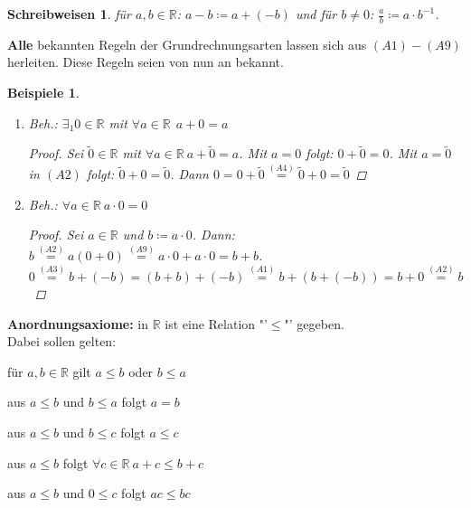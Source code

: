\documentclass[titlepage,ngerman,a4paper,headsepline]{scrartcl}
\newcommand{\R}{\mathbb{R}}
\theoremstyle{named}
\theoremstyle{dotless}
\newtheorem*{beispiele}{Beispiele}
\newtheorem*{schreibweisen}{Schreibweisen}
\begin{document}
\begin{schreibweisen}
	für $a, b \in \R$: $a - b \coloneqq a + (-b)$ und für $b \neq 0$: $ \frac{a}{b} \coloneqq a \cdot b^{-1}$.
\end{schreibweisen}


\textbf{Alle} bekannten Regeln der Grundrechnungsarten lassen sich aus \hyperref[k.axiom]{$(A1) - (A9)$} herleiten. Diese Regeln seien von nun an bekannt.


\begin{beispiele} ~\
	\begin{enumerate}
		\item Beh.: $\exists_{1} 0 \in  \R$ mit $\forall a \in \R \: \ a + 0 = a$
		  \begin{proof}
			Sei $\tilde{0} \in \R$ mit $\forall a \in \R \: a + \tilde{0} = a$. Mit $a = 0$ folgt: $0 + \tilde{0} = 0$. Mit $a = \tilde{0}$ in \hyperref[k.axiom-a2]{$(A2)$} folgt: $\tilde{0} + 0 = \tilde{0}$. Dann $0 = 0 + \tilde{0} \overset{\hyperref[k.axiom-a4]{(A4)}}{=} \tilde{0} + 0 = \tilde{0}$
		  \end{proof}
		 \item Beh.: $\forall a \in \R \: a \cdot 0 = 0$
		   \begin{proof}
		     Sei $a \in \R$ und $b \coloneqq a \cdot 0$. Dann: $b \overset{\hyperref[k.axiom-a2]{(A2)}}{=} a (0 + 0) \overset{\hyperref[k.axiom-a9]{(A9)}}{=} a \cdot 0 + a \cdot 0 = b + b$. \\
		     $0 \overset{\hyperref[k.axiom-a2]{(A3)}}{=} b + (-b) = (b + b) + (-b) \overset{\hyperref[k.axiom-a1]{(A1)}}{=} b + (b + (-b)) = b + 0 \overset{\hyperref[k.axiom-a2]{(A2)}}{=} b$
		   \end{proof}
	\end{enumerate}
\end{beispiele}

\textbf{Anordnungsaxiome:} in $\R$ ist eine Relation "'$\leq$"' gegeben. \\
Dabei sollen gelten:
\begin{description} \addtolength{\itemindent}{0.4cm}
	\item[$(A10)$] für $a, b \in \R$ gilt $a \leq b$ oder $b \leq a$ \label{a.axiom-a10}
	\item[$(A11)$] aus $a \leq b$ und $b \leq a$ folgt $a = b$ \label{a.axiom-a11}
	\item[$(A12)$] aus $a \leq b$ und $b \leq c$ folgt $a \leq c$ \label{a.axiom-a12}
	\item[$(A13)$] aus $a \leq b$ folgt $\forall c \in \R \: a + c \leq b + c$ \label{a.axiom-a13}
	\item[$(A14)$] aus $a \leq b$ und $0 \leq c$ folgt $ac \leq b c$ \label{a.axiom-a14}
\end{description}
\end{document}
